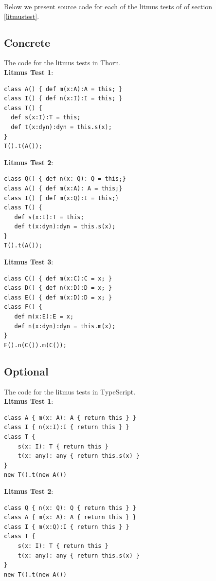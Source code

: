 \documentclass[runnningheads]{tex/llncs}
\begin{document}
Below we present source code for each of the litmus tests of 
of section \ref{litmustest}. 

\subsection*{Concrete}

The code for the litmus tests in Thorn. \\ 

\noindent
\textbf{Litmus Test 1}:
\begin{verbatim}
class A() { def m(x:A):A = this; }
class I() { def n(x:I):I = this; }
class T() {
  def s(x:I):T = this;
  def t(x:dyn):dyn = this.s(x);
}
T().t(A());
\end{verbatim}

\noindent
\textbf{Litmus Test 2}:
\begin{verbatim}
class Q() { def n(x: Q): Q = this;}
class A() { def m(x:A): A = this;}
class I() { def m(x:Q):I = this;}
class T() {
   def s(x:I):T = this; 
   def t(x:dyn):dyn = this.s(x);
}
T().t(A());   
\end{verbatim}


\noindent\textbf{Litmus Test 3}:
\begin{verbatim}
class C() { def m(x:C):C = x; }
class D() { def n(x:D):D = x; }
class E() { def m(x:D):D = x; }      
class F() {
   def m(x:E):E = x;
   def n(x:dyn):dyn = this.m(x);
} 
F().n(C()).m(C());
\end{verbatim}

\subsection*{Optional}

The code for the litmus tests in TypeScript. \\

\noindent\textbf{Litmus Test 1}:
\begin{verbatim}
class A { m(x: A): A { return this } }
class I { n(x:I):I { return this } }
class T {
    s(x: I): T { return this }
    t(x: any): any { return this.s(x) }
}
new T().t(new A())
\end{verbatim}

\noindent\textbf{Litmus Test 2}:
\begin{verbatim}
class Q { n(x: Q): Q { return this } }
class A { m(x: A): A { return this } }
class I { m(x:Q):I { return this } }
class T {
    s(x: I): T { return this }
    t(x: any): any { return this.s(x) }
}
new T().t(new A())
\end{verbatim}
\end{document}
